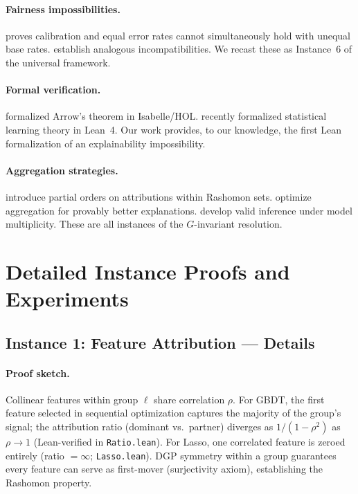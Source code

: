 \documentclass{article}
\newcommand{\GBDT}{\textsc{GBDT}}
\begin{document}
\paragraph{Fairness impossibilities.}
\citet{chouldechova2017fair} proves calibration and equal error rates cannot simultaneously hold with unequal base rates.  \citet{kleinberg2017inherent} establish analogous incompatibilities.  We recast these as Instance~6 of the universal framework.

\paragraph{Formal verification.}
\citet{nipkow2009social} formalized Arrow's theorem in Isabelle/HOL.
\citet{zhang2026statistical} recently formalized statistical learning theory in Lean~4.
Our work provides, to our knowledge, the first Lean formalization of an explainability impossibility.

\paragraph{Aggregation strategies.}
\citet{laberge2023partial} introduce partial orders on attributions within Rashomon sets.
\citet{decker2024provably} optimize aggregation for provably better explanations.
\citet{herren2023statistical} develop valid inference under model multiplicity.
These are all instances of the $G$-invariant resolution.

\section{Detailed Instance Proofs and Experiments}
\label{app:instances}

\subsection{Instance 1: Feature Attribution --- Details}

\paragraph{Proof sketch.}
Collinear features within group $\ell$ share correlation $\rho$.  For \GBDT{}, the first feature selected in sequential optimization captures the majority of the group's signal; the attribution ratio (dominant vs.\ partner) diverges as $1/(1-\rho^2)$ as $\rho \to 1$ (Lean-verified in \texttt{Ratio.lean}).  For Lasso, one correlated feature is zeroed entirely (ratio $= \infty$; \texttt{Lasso.lean}).  DGP symmetry within a group guarantees every feature can serve as first-mover (surjectivity axiom), establishing the Rashomon property.
\end{document}
